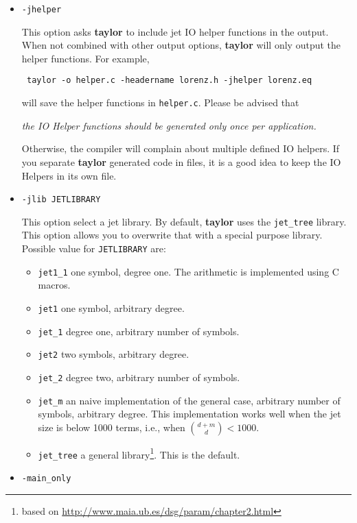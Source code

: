 \documentclass[10pt]{article}
\theoremstyle{remark}
\newcommand{\taylorname}{{\bf taylor}}
\begin{document}
\begin{itemize}
{The code needs a header file (defining the macros for the arithmetic)
in order to be compiled into object code. The default header filename
is {\tt taylor.h}.  The header filename can be changed using
{\verb+-headername NAME+} (see below).  You can also use the
{\verb+-header+} option to include the necessary macros in the output
file.}

\item{\verb+-jhelper+

This option asks \taylorname{} to include jet IO helper functions in
the output.  When not combined with other output options,
\taylorname{} will only output the helper functions. For example,

\verb+ taylor -o helper.c -headername lorenz.h -jhelper lorenz.eq+

will save the helper functions in \verb+helper.c+. Please be advised
that
\begin{center} 
{\em the IO Helper functions should be generated only once per
  application.}
\end{center} 
Otherwise, the compiler will complain about multiple defined IO
helpers.  If you separate \taylorname{} generated code in files, it is
a good idea to keep the IO Helpers in its own file.  }
\item{\verb+-jlib JETLIBRARY+ 

This option select a jet library. By default, \taylorname{} uses the
\verb+jet_tree+ library. This option allows you to overwrite that with
a special purpose library. Possible value for \verb+JETLIBRARY+ are:
\begin{itemize}
    \item \verb+jet1_1+ one symbol, degree one. The arithmetic is
      implemented using C macros.
    \item \verb+jet1+  one symbol, arbitrary degree. 
    \item \verb+jet_1+ degree one, arbitrary number of symbols.
    \item \verb+jet2+ two symbols, arbitrary degree.
    \item \verb+jet_2+ degree two, arbitrary number of symbols.
    \item \verb+jet_m+ an naive implementation of the general case,
      arbitrary number of symbols, arbitrary degree. This
      implementation works well when the jet size is below 1000 terms,
      i.e., when ${{d+m} \choose {d}} < 1000$.
    \item \verb+jet_tree+ a general library\footnote{based on \url{
 http://www.maia.ub.es/dsg/param/chapter2.html}}. This is the default.
\end{itemize}
}
\item{\verb+-main_only+

}
\end{itemize}
\end{document}
